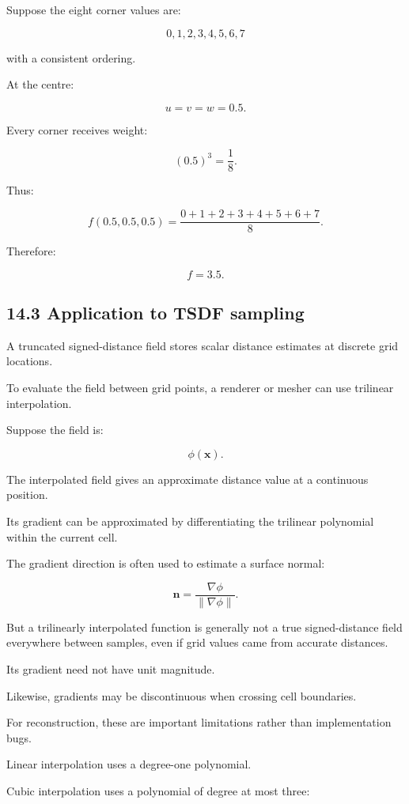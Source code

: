 Suppose the eight corner values are:

\[ 0,1,2,3,4,5,6,7 \]

with a consistent ordering.

At the centre:

\[ u=v=w=0.5. \]

Every corner receives weight:

\[ (0.5)^3=\frac18. \]

Thus:

\[ f(0.5,0.5,0.5) = \frac{0+1+2+3+4+5+6+7}{8}. \]

Therefore:

\[ \boxed{f=3.5}. \]

\subsection{14.3 Application to TSDF sampling}\label{02-foundations-ii-ch028-application-to-tsdf-sampling}

A truncated signed-distance field stores scalar distance estimates at discrete grid locations.

To evaluate the field between grid points, a renderer or mesher can use trilinear interpolation.

Suppose the field is:

\[ \phi(\mathbf x). \]

The interpolated field gives an approximate distance value at a continuous position.

Its gradient can be approximated by differentiating the trilinear polynomial within the current cell.

The gradient direction is often used to estimate a surface normal:

\[ \mathbf n= \frac{\nabla\phi}{\|\nabla\phi\|}. \]

But a trilinearly interpolated function is generally not a true signed-distance field everywhere between samples, even if grid values came from accurate distances.

Its gradient need not have unit magnitude.

Likewise, gradients may be discontinuous when crossing cell boundaries.

For reconstruction, these are important limitations rather than implementation bugs.

Linear interpolation uses a degree-one polynomial.

Cubic interpolation uses a polynomial of degree at most three:

